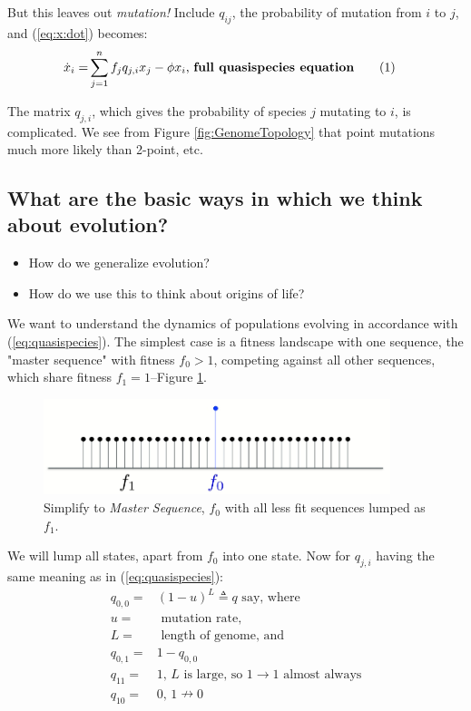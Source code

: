 \documentclass[]{article}
\newcommand\numberthis{\addtocounter{equation}{1}\tag{\theequation}}
\begin{document}
But this leaves out \emph{mutation!} Include $q_{ij}$, the probability of mutation from $i$ to $j$, and (\ref{eq:x:dot}) becomes:
\begin{align*}
	\dot x_i =& \sum_{j=1}^{n} f_j q_{j,i}x_j - \phi x_i\text{, \textbf{full quasispecies equation}} \numberthis \label{eq:quasispecies}
\end{align*}

The matrix $q_{j,i}$, which gives the probability of species $j$ mutating to $i$, is complicated. We see from Figure \ref{fig:GenomeTopology} that point mutations much more likely than 2-point, etc.

\subsection{What are the basic ways in which we think about evolution?}

\begin{itemize}
	\item How do we generalize evolution?
	\item How do we use this to think about origins of life? 
\end{itemize}

We want to understand the dynamics of populations evolving in accordance with (\ref{eq:quasispecies}). The simplest case is a fitness landscape with one sequence, the "master sequence" with fitness $f_0>1$, competing against all other sequences, which share fitness $f_1=1$--Figure \ref{fig:SteadyStateSolution}. 
\begin{figure}[H]
	\caption[Simplify to \emph{Master Sequence}]{Simplify to \emph{Master Sequence}, $f_0$ with all less fit sequences lumped as $f_1$.}\label{fig:SteadyStateSolution} 
	\includegraphics[width=0.9\textwidth]{SteadyStateSolution}
\end{figure}

We will lump all states, apart from $f_0$ into one state. Now for $q_{j,i}$ having the same meaning as in (\ref{eq:quasispecies}):
\begin{align*}
		q_{0,0} =& (1-u)^L \triangleq q \text{ say, where}\\
		u =& \text{ mutation rate,}\\
		L =& \text{ length of genome} \text{, and}\\
		q_{0,1} =& 1-q_{0,0}\\
		q_{11} =& 1\text{, $L$ is large, so 1$\rightarrow$1 almost always} \\
		q_{10} =& 0\text{, $1\nrightarrow0$}
\end{align*}
\end{document}
